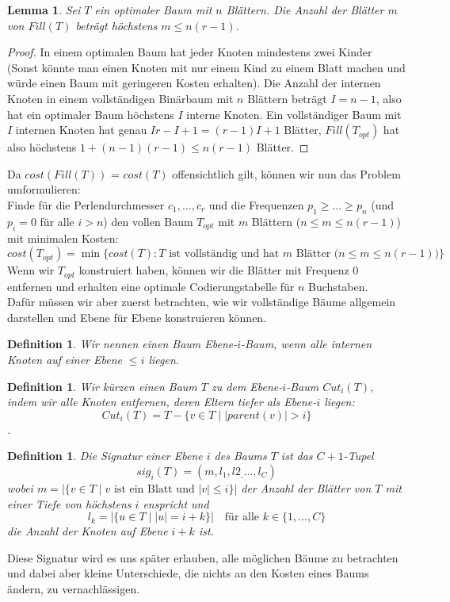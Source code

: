 \documentclass[a4paper,10pt,ngerman]{scrartcl}
\newtheorem{definition}[satz]{Definition}
\newtheorem{lemma}[satz]{Lemma}
\begin{document}
    \begin{lemma}
        Sei $T$ ein optimaler Baum mit $n$ Blättern. Die Anzahl der Blätter $m$ von $Fill(T)$ beträgt höchstens $m \le n(r-1)$.
    \end{lemma}
    \begin{proof}
        In einem optimalen Baum hat jeder Knoten mindestens zwei Kinder (Sonst könnte man einen Knoten mit nur einem Kind zu einem Blatt machen und würde einen Baum mit geringeren Kosten erhalten). Die Anzahl der internen Knoten in einem vollständigen Binärbaum mit $n$ Blättern beträgt $I = n - 1$, also hat ein optimaler Baum höchstens $I$ interne Knoten.
        Ein vollständiger Baum mit $I$ internen Knoten hat genau $Ir - I + 1 = (r-1)I + 1$ Blätter, $Fill(T_{opt})$ hat also höchstens $1 + (n -1)(r-1) \le n(r-1)$ Blätter.
    \end{proof}
    Da $cost(Fill(T))$ = $cost(T)$ offensichtlich gilt, können wir nun das Problem umformulieren:\\
    Finde für die Perlendurchmesser $c_1, \dots, c_r$ und die Frequenzen $p_1 \ge \dots \ge p_n$ (und $p_i = 0$ für alle $i > n$) den vollen Baum $T_{opt}$ mit $m$ Blättern ($n \le m \le n(r - 1)$) mit minimalen Kosten:
    \[cost(T_{opt}) = \min \{cost(T) : T \text{ ist vollständig und hat $m$ Blätter ($n \le m \le n(r - 1)$)}\}\]
    Wenn wir $T_{opt}$ konstruiert haben, können wir die Blätter mit Frequenz 0 entfernen und erhalten eine optimale Codierungstabelle für $n$ Buchstaben. \\
    Dafür müssen wir aber zuerst betrachten, wie wir vollständige Bäume allgemein darstellen und Ebene für Ebene konstruieren können.

    \begin{definition}
        Wir nennen einen Baum Ebene-$i$-Baum, wenn alle internen Knoten auf einer Ebene $\le i$ liegen. \\
    \end{definition}
    \begin{definition}
        Wir kürzen einen Baum $T$ zu dem Ebene-$i$-Baum $Cut_i(T)$, indem wir alle Knoten entfernen, deren Eltern tiefer als Ebene-$i$ liegen: \[Cut_i(T) = T - \{v \in T \mid |parent(v)| > i\}\].
    \end{definition}
    \begin{definition}
        Die Signatur einer Ebene $i$ des Baums $T$ ist das $C + 1$-Tupel \[sig_i(T) = (m, l_1,l2_, \dots, l_C)\]
        wobei $m = |\{v \in T \mid v \text{ ist ein Blatt und } |v| \le i\}|$ der Anzahl der Blätter von $T$ mit einer Tiefe von höchstens $i$ enspricht und
        \[l_k = |\{u \in T \mid |u| = i + k\}| \text{~~~für alle } k \in \{1,\dots,C\}\]
        die Anzahl der Knoten auf Ebene $i + k$ ist.
    \end{definition}
    Diese Signatur wird es uns später erlauben, alle möglichen Bäume zu betrachten und dabei aber kleine Unterschiede, die nichts an den Kosten eines Baums ändern, zu vernachlässigen.
\end{document}
